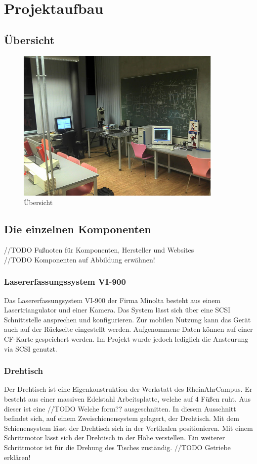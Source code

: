 \documentclass[11pt,twoside]{report}
\begin{document}
\section{Projektaufbau}
\subsection{Übersicht}
\begin{figure}[hp]
	\centering
	\includegraphics[width=10cm]{./_Res/Uebersicht.jpg}
	\caption{Übersicht}
\end{figure}
\subsection{Die einzelnen Komponenten}
//TODO Fußnoten für Komponenten, Hersteller und Websites\\
//TODO Komponenten auf Abbildung erwähnen!
\subsubsection{Lasererfassungssystem VI-900}
Das Lasererfassungsystem VI-900 der Firma Minolta besteht aus einem Lasertriangulator und einer Kamera. Das System lässt sich über eine SCSI Schnittstelle ansprechen und konfigurieren. Zur mobilen Nutzung kann das Gerät   auch auf der Rückseite eingestellt werden. Aufgenommene Daten können auf einer CF-Karte gespeichert werden. Im Projekt wurde jedoch lediglich die Ansteurung via SCSI genutzt.
\subsubsection{Drehtisch}
Der Drehtisch ist eine Eigenkonstruktion der Werkstatt des RheinAhrCampus. Er besteht aus einer massiven Edelstahl Arbeitsplatte, welche auf 4 Füßen ruht. Aus dieser ist eine //TODO Welche form?? ausgeschnitten. In diesem Ausschnitt befindet sich, auf einem Zweischienensystem gelagert, der Drehtisch. Mit dem Schienensystem lässt der Drehtisch sich in der Vertikalen positionieren. Mit einem Schrittmotor lässt sich der Drehtisch in der Höhe verstellen. Ein weiterer Schrittmotor ist für die Drehung des Tisches zuständig. //TODO Getriebe erklären!  
\end{document}
